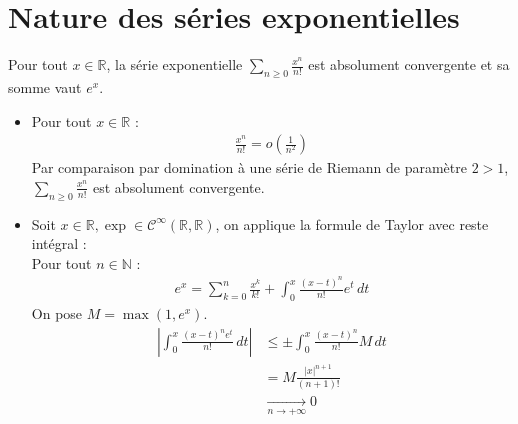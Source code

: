 \documentclass[../main.tex]{subfiles}
\begin{document}
\section{Nature des séries exponentielles}
\begin{tcolorbox}[title=Théorème 27.30, title filled=false, colframe=orange, colback=orange!10!white]
    Pour tout $x\in \mathbb{R}$, la série exponentielle $\sum\limits_{n\geq 0} \frac{x^n}{n!}$ est absolument convergente et sa somme vaut $e^x$. 
\end{tcolorbox}

\begin{itemize}
    \item Pour tout $x\in \mathbb{R}$ : 
    \begin{align*}
        \frac{x^n}{n!} = o \left( \frac{1}{n^2} \right)
    \end{align*}
    Par comparaison par domination à une série de Riemann de paramètre $2 > 1$, $\sum\limits_{n\geq 0} \frac{x^n}{n!}$ est absolument convergente. 

    \item Soit $x\in \mathbb{R}, \exp \in \mathcal{C}^{\infty}(\mathbb{R}, \mathbb{R})$, on applique la formule de Taylor avec reste intégral : \\
    Pour tout $n\in \mathbb{N}$ : 
    \begin{align*}
        e^x = \sum_{k=0}^{n} \frac{x^k}{k!} + \int_{0}^{x} \frac{(x-t)^n}{n!} e^t \,dt
    \end{align*}
    On pose $M = \max (1, e^x)$. 
    \begin{align*}
        \left| \int_{0}^{x} \frac{(x - t)^n e^t}{n!} \,dt \right| &\leq \pm \int_{0}^{x} \frac{(x - t)^n}{n!} M \,dt \\
        &= M \frac{|x|^{n+1}}{(n+1)!} \\
        &\underset{n \to +\infty}{\longrightarrow} 0
    \end{align*}
\end{itemize}
\end{document}
